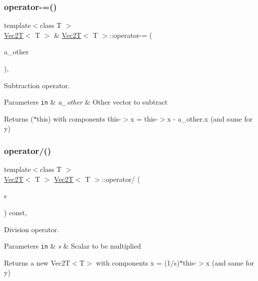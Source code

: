 \subsubsection{\texorpdfstring{operator-\/=()}{operator-=()}}
{\footnotesize\ttfamily template$<$class T $>$ \\
\hyperlink{classVec2T}{Vec2T}$<$ T $>$ \& \hyperlink{classVec2T}{Vec2T}$<$ T $>$\+::operator-\/= (\begin{DoxyParamCaption}\item[{const \hyperlink{classVec2T}{Vec2T}$<$ T $>$ \&}]{a\+\_\+other }\end{DoxyParamCaption})\hspace{0.3cm}{\ttfamily [inline]}, {\ttfamily [noexcept]}}



Subtraction operator. 


\begin{DoxyParams}[1]{Parameters}
\mbox{\tt in}  & {\em a\+\_\+other} & Other vector to subtract\\
\hline
\end{DoxyParams}
Returns ($\ast$this) with components this-\/$>$x = this-\/$>$x -\/ a\+\_\+other.\+x (and same for y) \mbox{\label{classVec2T_a3cc96a6930ed713df486d177490e1e5c}} 
\subsubsection{\texorpdfstring{operator/()}{operator/()}}
{\footnotesize\ttfamily template$<$class T $>$ \\
\hyperlink{classVec2T}{Vec2T}$<$ T $>$ \hyperlink{classVec2T}{Vec2T}$<$ T $>$\+::operator/ (\begin{DoxyParamCaption}\item[{const T \&}]{s }\end{DoxyParamCaption}) const\hspace{0.3cm}{\ttfamily [inline]}, {\ttfamily [noexcept]}}



Division operator. 


\begin{DoxyParams}[1]{Parameters}
\mbox{\tt in}  & {\em s} & Scalar to be multiplied\\
\hline
\end{DoxyParams}
Returns a new Vec2\+T$<$\+T$>$ with components x = (1/s)$\ast$this-\/$>$x (and same for y) \mbox{\label{classVec2T_a84e4a2ee2d84fbb42c84d0638ff929f8}} 
